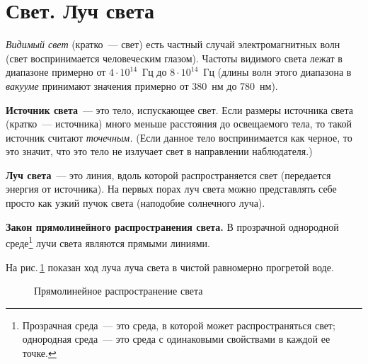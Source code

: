 \documentclass[main.tex]{subfiles}
\begin{document}

\pagestyle{empty}

 

\setcounter{section}{1
}
\addtocounter{section}{-1} 

\section{Свет. Луч света}


\emph{Видимый свет} (кратко~--- свет) есть частный случай электромагнитных волн (свет воспринимается человеческим глазом). Частоты видимого света лежат в диапазоне примерно от $4\cdot10^{14}$~Гц до $8\cdot10^{14}$~Гц (длины волн этого диапазона в \emph{вакууме} принимают значения примерно от 380~нм до 780~нм).

\textbf{Источник света}~--- это тело, испускающее свет. Если размеры источника света (кратко~--- источника) много меньше расстояния до освещаемого тела, то такой источник считают \emph{точечным.} (Если данное тело воспринимается как черное, то это значит, что это тело не излучает свет в направлении наблюдателя.)

\textbf{Луч света}~--- это линия, вдоль которой распространяется свет (передается энергия от источника). На первых порах луч света можно представлять себе просто как узкий пучок света (наподобие солнечного луча).
%
\begin{law}
    \textbf{Закон прямолинейного распространения света.} В прозрачной однородной среде\footnote{Прозрачная среда~--- это среда, в которой может распространяться свет; однородная среда~--- это среда с одинаковыми свойствами в каждой ее точке.} лучи света являются прямыми линиями.
\end{law}
%
На рис.\,\ref{fig:p173} показан ход луча луча света в чистой равномерно прогретой воде.

\begin{figure}[H]
    \centering

\caption{Прямолинейное распространение света}
\label{fig:p173}
\end{figure}
\end{document}

